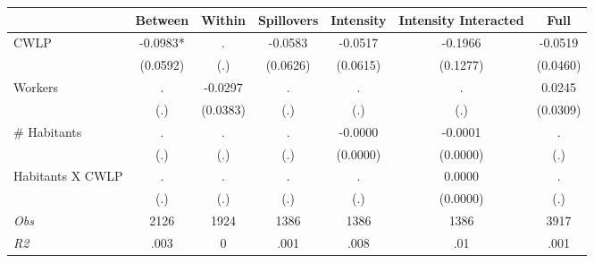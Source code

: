 \begin{tabular}{l*{6}{c}}\hline&\multicolumn{1}{c}{Between}&\multicolumn{1}{c}{Within}&\multicolumn{1}{c}{Spillovers}&\multicolumn{1}{c}{Intensity}&\multicolumn{1}{c}{Intensity Interacted}&\multicolumn{1}{c}{Full}\\ \hline 
CWLP & -0.0983* & . & -0.0583 & -0.0517 & -0.1966 & -0.0519 \\
 & (0.0592) & (.) & (0.0626) & (0.0615) & (0.1277) & (0.0460) \\
Workers & . & -0.0297 & . & . & . & 0.0245 \\
 & (.) & (0.0383) & (.) & (.) & (.) & (0.0309) \\
\# Habitants & . & . & . & -0.0000 & -0.0001 & . \\
 & (.) & (.) & (.) & (0.0000) & (0.0000) & (.) \\
Habitants X CWLP & . & . & . & . & 0.0000 & . \\
 & (.) & (.) & (.) & (.) & (0.0000) & (.) \\
\hline \textit{Obs} & 2126 & 1924 & 1386 & 1386 & 1386 & 3917 \\ \textit{R2} & .003 & 0 & .001 & .008 & .01 & .001 \\ \hline \end{tabular}
